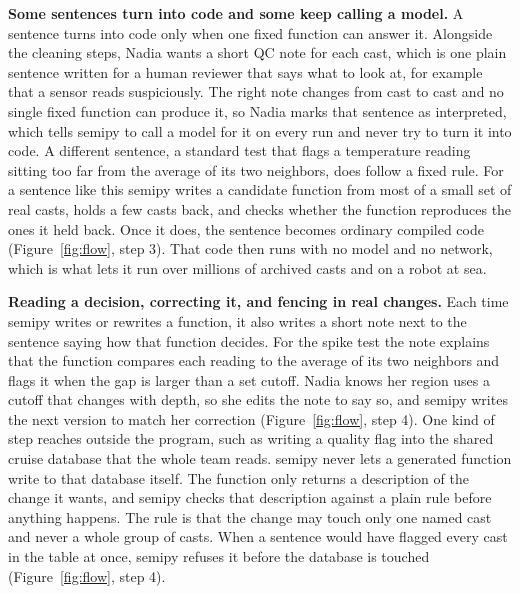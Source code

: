 \documentclass[9pt]{extarticle}
\begin{document}
\textbf{Some sentences turn into code and some keep calling a model.} A
sentence turns into code only when one fixed function can answer it. Alongside
the cleaning steps, Nadia wants a short QC note for each cast, which is one
plain sentence written for a human reviewer that says what to look at, for
example that a sensor reads suspiciously. The right note changes from cast to
cast and no single fixed function can produce it, so Nadia marks that sentence
as interpreted, which tells semipy to call a model for it on every run and
never try to turn it into code. A different sentence, a standard test that
flags a temperature reading sitting too far from the average of its two
neighbors, does follow a fixed rule. For a sentence like this semipy writes a
candidate function from most of a small set of real casts, holds a few casts
back, and checks whether the function reproduces the ones it held back. Once
it does, the sentence becomes ordinary compiled code (Figure~\ref{fig:flow},
step 3). That code then runs with no model and no network, which is what lets
it run over millions of archived casts and on a robot at sea.

\textbf{Reading a decision, correcting it, and fencing in real changes.} Each
time semipy writes or rewrites a function, it also writes a short note next to
the sentence saying how that function decides. For the spike test the note
explains that the function compares each reading to the average of its two
neighbors and flags it when the gap is larger than a set cutoff. Nadia knows
her region uses a cutoff that changes with depth, so she edits the note to say
so, and semipy writes the next version to match her correction
(Figure~\ref{fig:flow}, step 4). One kind of step reaches outside the program,
such as writing a quality flag into the shared cruise database that the whole
team reads. semipy never lets a generated function write to that database
itself. The function only returns a description of the change it wants, and
semipy checks that description against a plain rule before anything happens.
The rule is that the change may touch only one named cast and never a whole
group of casts. When a sentence would have flagged every cast in the table at
once, semipy refuses it before the database is touched (Figure~\ref{fig:flow},
step 4).
\end{document}
